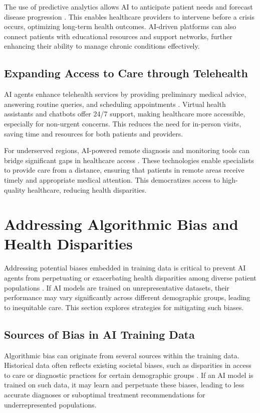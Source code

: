\documentclass[12pt,a4paper]{article}
\begin{document}
The use of predictive analytics allows AI to anticipate patient needs and forecast disease progression \cite{ibm.com}. This enables healthcare providers to intervene before a crisis occurs, optimizing long-term health outcomes. AI-driven platforms can also connect patients with educational resources and support networks, further enhancing their ability to manage chronic conditions effectively.

\subsection{Expanding Access to Care through Telehealth}
AI agents enhance telehealth services by providing preliminary medical advice, answering routine queries, and scheduling appointments \cite{aidoc.com}. Virtual health assistants and chatbots offer 24/7 support, making healthcare more accessible, especially for non-urgent concerns. This reduces the need for in-person visits, saving time and resources for both patients and providers.

For underserved regions, AI-powered remote diagnosis and monitoring tools can bridge significant gaps in healthcare access \cite{intellias.com}. These technologies enable specialists to provide care from a distance, ensuring that patients in remote areas receive timely and appropriate medical attention. This democratizes access to high-quality healthcare, reducing health disparities.

\section{Addressing Algorithmic Bias and Health Disparities}
Addressing potential biases embedded in training data is critical to prevent AI agents from perpetuating or exacerbating health disparities among diverse patient populations \cite{tonic.ai}. If AI models are trained on unrepresentative datasets, their performance may vary significantly across different demographic groups, leading to inequitable care. This section explores strategies for mitigating such biases.

\subsection{Sources of Bias in AI Training Data}
Algorithmic bias can originate from several sources within the training data. Historical data often reflects existing societal biases, such as disparities in access to care or diagnostic practices for certain demographic groups \cite{shah2019artificial}. If an AI model is trained on such data, it may learn and perpetuate these biases, leading to less accurate diagnoses or suboptimal treatment recommendations for underrepresented populations.
\end{document}

